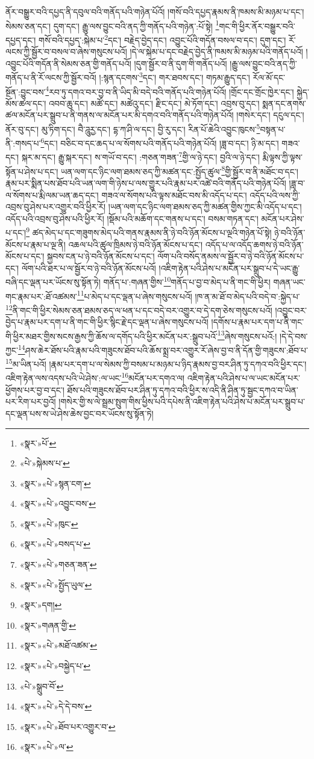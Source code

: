 ནོར་བསྒྱུར་བའི་དཔྱད་ནི་དབུལ་བའི་གནོད་པའི་གཉེན་པོའོ། །གསོ་བའི་དཔྱད་རྣམས་ནི་ཁམས་མི་མཉམ་པ་དང་། སེམས་ཅན་དང་། དུག་དང་། རྒྱུ་ལས་བྱུང་བའི་ནད་ཀྱི་གནོད་པའི་གཉེན་:པོ་སྟེ། \footnote{«སྣར་»པོ་}གང་གི་ཕྱིར་ནོར་བསྒྱུར་བའི་དཔྱད་དང་། གསོ་བའི་དཔྱད་:སྐེམ་པ་\footnote{«པེ་»སྐེམས་པ་}དང་། བརྗེད་བྱེད་དང་། འབྱུང་པོའི་གདོན་བསལ་བ་དང་། དུག་དང་། རོ་ལངས་ཀྱི་སྦྱོར་བ་བསལ་བ་ཞེས་གསུངས་པའོ། །དེ་ལ་སྐེམ་པ་དང་བརྗེད་བྱེད་ནི་ཁམས་མི་མཉམ་པའི་གནོད་པའོ། །འབྱུང་པོའི་གདོན་ནི་སེམས་ཅན་གྱི་གནོད་པའོ། །དུག་སྦྱོར་བ་ནི་དུག་གི་གནོད་པའོ། །རྒྱུ་ལས་བྱུང་བའི་ནད་ཀྱི་གནོད་པ་ནི་རོ་ལངས་ཀྱི་སྦྱོར་བའོ། །:སྙན་དངགས་\footnote{«སྣར་»«པེ་»སྙན་ངག་}དང་། གར་ཐབས་དང་། གཏམ་རྒྱུད་དང་། རོལ་མོ་དང་སྔོན་:བྱུང་བས་\footnote{«སྣར་»«པེ་»འབྱུང་བས་}རབ་ཏུ་དགའ་བར་བྱ་བ་ནི་ཡིད་མི་བདེ་བའི་གནོད་པའི་གཉེན་པོའོ། །གྲོང་དང་གྲོང་ཁྱེར་དང་། སྐྱེད་མོས་ཚལ་དང་། འབབ་ཆུ་དང་། མཚོ་དང་། མཚེའུ་དང་། རྫིང་དང་། མེ་ཏོག་དང་། འབྲས་བུ་དང་། སྨན་དང་ནགས་ཚལ་མངོན་པར་སྒྲུབ་པ་ནི་གནས་ལ་མངོན་པར་མི་དགའ་བའི་གནོད་པའི་གཉེན་པོའོ། །གསེར་དང་། དངུལ་དང་། ནོར་བུ་དང་། མུ་ཏིག་དང་། བཻ་ཌཱུརྱ་དང་། དྷ་ཀ་ཤི་ལ་དང་། བྱི་རུ་དང་། རིན་པོ་ཆེའི་འབྱུང་ཁུངས་\footnote{«སྣར་»«པེ་»ཁུང་}བསྟན་པ་ནི་:གསད་པ་\footnote{«སྣར་»«པེ་»བསད་པ་}དང་། བཅིང་བ་དང་ཆད་པ་ལ་སོགས་པའི་གནོད་པའི་གཉེན་པོའོ། །ཟླ་བ་དང་། ཉི་མ་དང་། གཟའ་དང་། སྐར་མ་དང་། རྒྱུ་སྐར་དང་། ས་གཡོ་བ་དང་། :གཅན་གཟན་\footnote{«སྣར་»«པེ་»གཅན་ཟན་}གྱི་ལ་ཉེ་དང་། བྱའི་ལ་ཉེ་དང་། རྨི་ལྟས་ཀྱི་ལྟས་སྟོན་པ་ཤེས་པ་དང་། ཡན་ལག་དང་ཉིང་ལག་ཐམས་ཅད་ཀྱི་མཚན་དང་:སྤྱོད་ཚུལ་\footnote{«སྣར་»«པེ་»སྤྱོད་ཡུལ་}གྱི་སྦྱོར་བ་ནི་མཐོང་བ་དང་། རྣམ་པར་སྨིན་པས་ཐོབ་པའི་ཡན་ལག་གི་ཉེས་པ་ལས་གྱུར་པའི་རྣམ་པར་འཚེ་བའི་གནོད་པའི་གཉེན་པོའོ། །ཟླ་བ་ལ་སོགས་པ་རྨི་ལམ་ཡན་ཆད་དང་། གཟའ་ལ་སོགས་པའི་ལྟས་མཐོང་བས་མི་འདོད་པ་དང་། འདོད་པའི་ལས་ཀྱི་འབྲས་བུ་ཤེས་པར་འགྱུར་བའི་ཕྱིར་རོ། །ཡན་ལག་དང་ཉིང་ལག་ཐམས་ཅད་ཀྱི་མཚན་གྱིས་ཀྱང་མི་འདོད་པ་དང་། འདོད་པའི་འབྲས་བུ་ཤེས་པའི་ཕྱིར་རོ། །སྡོམ་པའི་མཆོག་དང་གནས་པ་དང་། བསམ་གཏན་དང་། མངོན་པར་ཤེས་པ་དང་།\footnote{«སྣར་»དག།} ཚད་མེད་པ་དང་གཟུགས་མེད་པའི་གནས་རྣམས་ནི་ཉེ་བའི་ཉོན་མོངས་པ་ལྔའི་གཉེན་པོ་སྟེ། ཉེ་བའི་ཉོན་མོངས་པ་རྣམ་པ་ལྔ་ནི། འཆལ་པའི་ཚུལ་ཁྲིམས་ཉེ་བའི་ཉོན་མོངས་པ་དང་། འདོད་པ་ལ་འདོད་ཆགས་ཉེ་བའི་ཉོན་མོངས་པ་དང་། སྐྱབས་ངན་པ་ཉེ་བའི་ཉོན་མོངས་པ་དང་། ལོག་པའི་བསོད་ནམས་ལ་སྦྱོར་བ་ཉེ་བའི་ཉོན་མོངས་པ་དང་། ལོག་པའི་ཐར་པ་ལ་སྦྱོར་བ་ཉེ་བའི་ཉོན་མོངས་པའོ། །འཇིག་རྟེན་པའི་ཤེས་པ་མངོན་པར་སྒྲུབ་པ་དེ་ཡང་རྒྱུ་བཞི་དང་ལྡན་པར་ཡོངས་སུ་སྟོན་ཏེ། གནོད་པ་:གཞན་གྱིས་\footnote{«སྣར་»གཞན་གྱི་}གནོད་པ་བྱ་བ་མེད་པ་ནི་གང་གི་ཕྱིར། གཞན་ཡང་གང་རྣམ་པར་:ཐོ་འཚམས་\footnote{«སྣར་»«པེ་»མཐོ་འཚམ་}པ་མེད་པ་དང་ལྡན་པ་ཞེས་གསུངས་པའོ། །ཁ་ན་མ་ཐོ་བ་མེད་པའི་བདེ་བ་:སྐྱེད་པ་\footnote{«སྣར་»«པེ་»བསྐྱེད་པ་}ནི་གང་གི་ཕྱིར་སེམས་ཅན་ཐམས་ཅད་ལ་ཕན་པ་དང་བདེ་བར་འགྱུར་བ་དེ་དག་ཅེས་གསུངས་པའོ། །འབྱུང་བར་བྱེད་པ་རྣམ་པར་དག་པ་ནི་གང་གི་ཕྱིར་སྙིང་རྗེ་དང་ལྡན་པ་ཞེས་གསུངས་པའོ། །དགོས་པ་རྣམ་པར་དག་པ་ནི་གང་གི་ཕྱིར་མཐར་གྱིས་སངས་རྒྱས་ཀྱི་ཆོས་ལ་དགོད་པའི་ཕྱིར་མངོན་པར་:སྒྲུབ་པའོ་\footnote{«པེ་»སྒྲུབ་བོ་}ཞེས་གསུངས་པའོ:། །དེ་དེ་བས་ཀྱང་\footnote{«སྣར་»«པེ་»དེ་དེ་བས་}ཤས་ཆེར་ཐོས་པའི་རྣམ་པའི་གཟུངས་ཐོབ་པའི་ཆོས་སྨྲ་བར་འགྱུར་རོ་ཞེས་བྱ་བ་ནི་དོན་གྱི་གཟུངས་:ཐོབ་པ་\footnote{«སྣར་»«པེ་»ཐོབ་པར་འགྱུར་བ་}མ་ཡིན་པའོ། །རྣམ་པར་དག་པ་ལ་སེམས་ཀྱི་བསམ་པ་མཉམ་པ་ཉིད་རྣམས་བྱ་བར་ཤིན་ཏུ་དཀའ་བའི་ཕྱིར་དང་། འཇིག་རྟེན་ལས་འདས་པའི་ཡེ་ཤེས་:ལ་ཡང་\footnote{«སྣར་»«པེ་»ལ་}མངོན་པར་དགའ་ལ། འཇིག་རྟེན་པའི་ཤེས་པ་ལ་ཡང་མངོན་པར་ཕྱོགས་པར་བྱ་བ་དང་། ཐོས་པའི་གཟུངས་ཐོབ་པར་ཤིན་ཏུ་དཀའ་བའི་ཕྱིར་ས་འདི་ནི་ཤིན་ཏུ་སྦྱང་དཀའ་བ་ཡིན་པར་རིག་པར་བྱའོ། །གསེར་གྱི་ས་ལེ་སྦྲམ་སྤུག་གིས་ཕྱིས་པའི་དཔེས་ནི་འཇིག་རྟེན་པའི་ཤེས་པ་མངོན་པར་སྒྲུབ་པ་དང་ལྡན་པས་ས་ཡེ་ཤེས་ཆེས་བྱང་བར་ཡོངས་སུ་སྟོན་ཏེ། 